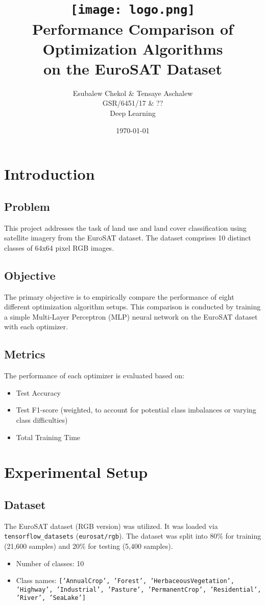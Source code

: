 \documentclass[11pt,a4paper]{article}
\title{
    \vspace{-1cm} %
    \texttt{[image: logo.png]} \\ %
    \vspace{0.5cm}
    \textbf{\Huge Performance Comparison of Optimization Algorithms \\ on the EuroSAT Dataset}
}
\author{Esubalew Chekol & Tensaye Aschalew \\ GSR/6451/17 & ?? \\ Deep Learning} %
\date{\today}
\begin{document}
\maketitle
\thispagestyle{empty} %
\clearpage

\tableofcontents %
\clearpage

\section{Introduction}
\subsection{Problem}
This project addresses the task of land use and land cover classification using satellite imagery from the EuroSAT dataset. The dataset comprises 10 distinct classes of 64x64 pixel RGB images.

\subsection{Objective}
The primary objective is to empirically compare the performance of eight different optimization algorithm setups. This comparison is conducted by training a simple Multi-Layer Perceptron (MLP) neural network on the EuroSAT dataset with each optimizer.

\subsection{Metrics}
The performance of each optimizer is evaluated based on:
\begin{itemize}
    \item Test Accuracy
    \item Test F1-score (weighted, to account for potential class imbalances or varying class difficulties)
    \item Total Training Time
\end{itemize}

\section{Experimental Setup}
\subsection{Dataset}
The EuroSAT dataset (RGB version) was utilized. It was loaded via \texttt{tensorflow\_datasets} (\texttt{eurosat/rgb}). The dataset was split into 80\% for training (21,600 samples) and 20\% for testing (5,400 samples).
\begin{itemize}
    \item Number of classes: 10
    \item Class names: \texttt{['AnnualCrop', 'Forest', 'HerbaceousVegetation', 'Highway', 'Industrial', 'Pasture', 'PermanentCrop', 'Residential', 'River', 'SeaLake']}
\end{itemize}
\end{document}
